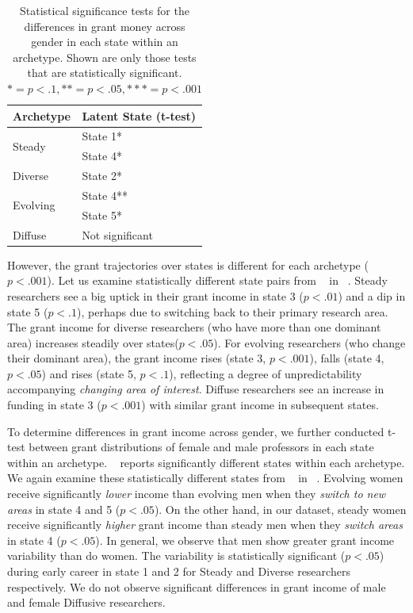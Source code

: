\begin{table}%
\centering
\begin{tabular}{ll}
\toprule
Archetype & Latent State (t-test) \\
\midrule
\multirow{2}{*}{Steady}   & State 1* \\
& State 4*  \\ \hline
Diverse   &  State 2*  \\ \hline
\multirow{2}{*}{Evolving}  & State 4** \\
& State 5*    \\  \hline
Diffuse & {Not significant}  \\
\bottomrule %
\end{tabular}
\caption{ \small
\label{tab:statgender}Statistical significance tests \cite{Welch:1947} for the differences in grant money across gender in each state within an archetype. Shown are only those tests that are statistically significant. \\ $* = p < .1, ** = p< .05, *{*}* = p < .001$}
\end{table}

However, the grant trajectories over states is different for each archetype ($p < .001$). Let us examine statistically different state pairs from ~ in ~. Steady researchers see a big uptick in their grant income in state 3 ($p < .01$) and a dip in state 5 ($p < .1$), perhaps due to switching back to their primary research area. The grant income for diverse researchers (who have more than one dominant area) increases steadily over states($p < .05$). For evolving researchers (who change their dominant area), the grant income rises (state 3, $p < .001$), falls (state 4, $p < .05$) and rises (state 5, $p < .1$), reflecting a degree of unpredictability accompanying \emph{changing area of interest}. Diffuse researchers see an increase in funding in state 3 ($p < .001$) with similar grant income in subsequent states.

To determine differences in grant income across gender, we further conducted t-test \cite{Welch:1947} between grant distributions of female and male professors in each state within an archetype. ~ reports significantly different states within each archetype. We again examine these statistically different states from ~ in ~. Evolving women receive significantly \emph{lower} income than evolving men when they \emph{switch to new areas} in state 4 and 5 ($p < .05$). On the other hand, in our dataset, steady women receive significantly \emph{higher} grant income than steady men when they \emph{switch areas} in state 4 ($p < .05$). In general, we observe that men show greater grant income variability than do women. The variability is statistically significant ($p < .05$) during early career in state 1 and 2 for Steady and Diverse researchers respectively. We do not observe significant differences in grant income of male and female Diffusive researchers.

